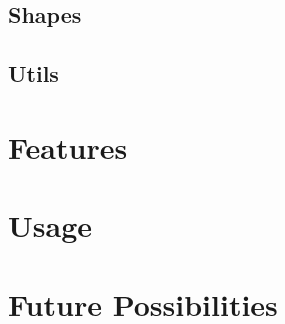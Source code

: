 \subsection{Shapes}\label{sec:overview:shapes}

\subsection{Utils}\label{sec:overview:utils}


\section{Features}\label{sec:features}


\section{Usage}\label{sec:usage}


\section{Future Possibilities}\label{sec:future}

